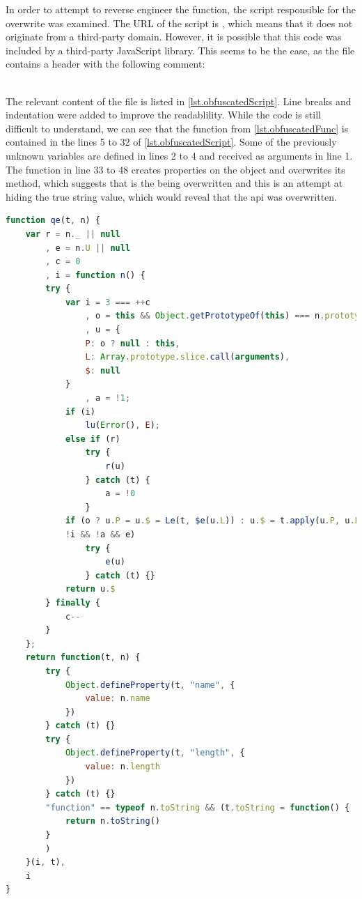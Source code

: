 In order to attempt to reverse engineer the function, the script responsible for the overwrite was examined. The URL of the script is , which means that it does not originate from a third-party domain. However, it is possible that this code was included by a third-party JavaScript library. This seems to be the case, as the file contains a header with the following comment:\\
\\

The relevant content of the file is listed in \autoref{lst.obfuscatedScript}. Line breaks and indentation were added to improve the readablility. While the code is still difficult to understand, we can see that the function  from \autoref{lst.obfuscatedFunc} is contained in the lines 5 to 32 of \autoref{lst.obfuscatedScript}. Some of the previously unknown variables are defined in lines 2 to 4 and received as arguments in line 1. The function in line 33 to 48 creates properties on the object  and overwrites its  method, which suggests that  is the \browserAPI{} being overwritten and this is an attempt at hiding the true string value, which would reveal that the \ac{api} was overwritten.

\begin{lstlisting}[language=JavaScript,breaklines=true,breakatwhitespace=true,label={lst.obfuscatedScript},caption={Content of obfuscated script}]
function qe(t, n) {
    var r = n._ || null
        , e = n.U || null
        , c = 0
        , i = function n() {
        try {
            var i = 3 === ++c
                , o = this && Object.getPrototypeOf(this) === n.prototype || !1
                , u = {
                P: o ? null : this,
                L: Array.prototype.slice.call(arguments),
                $: null
            }
                , a = !1;
            if (i)
                lu(Error(), E);
            else if (r)
                try {
                    r(u)
                } catch (t) {
                    a = !0
                }
            if (o ? u.P = u.$ = Le(t, $e(u.L)) : u.$ = t.apply(u.P, u.L),
            !i && !a && e)
                try {
                    e(u)
                } catch (t) {}
            return u.$
        } finally {
            c--
        }
    };
    return function(t, n) {
        try {
            Object.defineProperty(t, "name", {
                value: n.name
            })
        } catch (t) {}
        try {
            Object.defineProperty(t, "length", {
                value: n.length
            })
        } catch (t) {}
        "function" == typeof n.toString && (t.toString = function() {
            return n.toString()
        }
        )
    }(i, t),
    i
}
\end{lstlisting}

